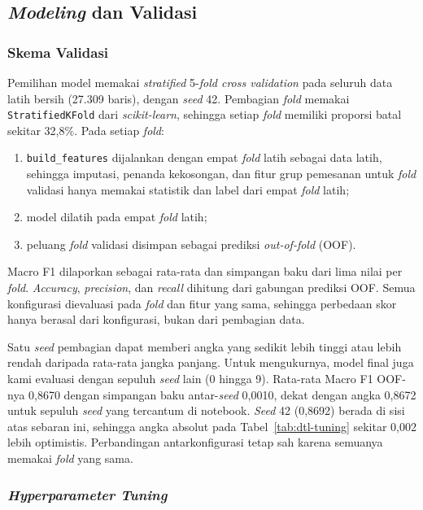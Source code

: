 \subsection{\textit{Modeling} dan Validasi}
\label{subsec:dtl-validasi}

\subsubsection{Skema Validasi}

Pemilihan model memakai \textit{stratified} 5-\textit{fold cross validation} pada seluruh data latih
bersih (27.309 baris), dengan \textit{seed} 42. Pembagian \textit{fold} memakai
\texttt{StratifiedKFold} dari \textit{scikit-learn}, sehingga setiap \textit{fold} memiliki proporsi
batal sekitar 32,8\%. Pada setiap \textit{fold}:
\begin{enumerate}
	\item \texttt{build\_features} dijalankan dengan empat \textit{fold} latih sebagai data latih,
	sehingga imputasi, penanda kekosongan, dan fitur grup pemesanan untuk \textit{fold} validasi hanya
	memakai statistik dan label dari empat \textit{fold} latih;
	\item model dilatih pada empat \textit{fold} latih;
	\item peluang \textit{fold} validasi disimpan sebagai prediksi \textit{out-of-fold} (OOF).
\end{enumerate}
Macro F1 dilaporkan sebagai rata-rata dan simpangan baku dari lima nilai per \textit{fold}.
\textit{Accuracy}, \textit{precision}, dan \textit{recall} dihitung dari gabungan prediksi OOF. Semua
konfigurasi dievaluasi pada \textit{fold} dan fitur yang sama, sehingga perbedaan skor hanya berasal
dari konfigurasi, bukan dari pembagian data.

Satu \textit{seed} pembagian dapat memberi angka yang sedikit lebih tinggi atau lebih rendah daripada
rata-rata jangka panjang. Untuk mengukurnya, model final juga kami evaluasi dengan sepuluh
\textit{seed} lain (0 hingga 9). Rata-rata Macro F1 OOF-nya 0,8670 dengan simpangan baku
antar-\textit{seed} 0,0010, dekat dengan angka 0,8672 untuk sepuluh \textit{seed} yang tercantum di
notebook. \textit{Seed} 42 (0,8692) berada di sisi atas sebaran ini, sehingga angka absolut pada
Tabel~\ref{tab:dtl-tuning} sekitar 0,002 lebih optimistis. Perbandingan antarkonfigurasi tetap sah
karena semuanya memakai \textit{fold} yang sama.

\subsubsection{\textit{Hyperparameter Tuning}}

